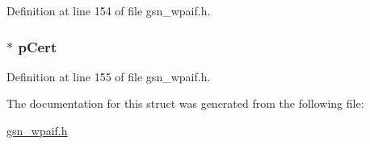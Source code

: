 Definition at line 154 of file gsn\_\-wpaif.h.

\hypertarget{a00421_ab18aead7468d6de4bc6631f5638c8005}{
\subsubsection[{pCert}]{$\ast$ {\bf pCert}}}
\label{a00421_ab18aead7468d6de4bc6631f5638c8005}


Definition at line 155 of file gsn\_\-wpaif.h.



The documentation for this struct was generated from the following file:\begin{DoxyCompactItemize}
\item 
\hyperlink{a00615}{gsn\_\-wpaif.h}\end{DoxyCompactItemize}
